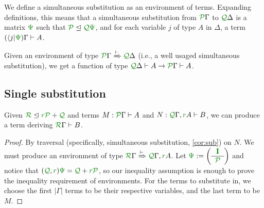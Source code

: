 \documentclass[submission,copyright,creativecommons]{eptcs}
\begin{document}
We define a simultaneous substitution as an environment of terms.
Expanding definitions, this means that a simultaneous substitution from
$\ctx\Gamma P$ to $\ctx\Delta Q$ is a matrix $\rescomment\Psi$ such that
$\resctx P \subres \resctx Q \rescomment\Psi$, and for each variable $j$ of
type $A$ in $\Delta$, a term $(\langle j \rvert\rescomment\Psi)\Gamma \vdash A$.

\begin{corollary}\label{cor:sub}
  Given an environment of type
  $\ctx{\Gamma}{P} \subst{\vdash} \ctx{\Delta}{Q}$ (i.e., a
  well usaged simultaneous substitution), we get a function of type
  $\ctx{\Delta}{Q} \vdash A \to \ctx{\Gamma}{P} \vdash A$.
\end{corollary}

\subsection{Single substitution}

\begin{corollary}\label{cor:single-subst}
  Given $\resctx R \subres \rescomment r \resctx P + \resctx Q$ and terms
  $M : \ctx\Gamma P \vdash A$ and $N : \ctx\Gamma Q, \ctxvar x A r \vdash B$,
  we can produce a term deriving $\ctx\Gamma R \vdash B$.
\end{corollary}
\begin{proof}
  By traversal (specifically, simultaneous substitution, \autoref{cor:sub})
  on $N$.
  We must produce an environment of type
  $\ctx\Gamma R \subst{\vdash} \ctx\Gamma Q, \ctxvar x A r$.
  Let \(
    \rescomment\Psi := \left(\begin{array}{c}
                               \rescomment{\mat I}
                               \\ \hline
                               \resctx P
                             \end{array}\right)
  \)
  and notice that $(\resctx Q, \rescomment r)\rescomment\Psi =
  \resctx Q + \rescomment r \resctx P$, so our inequality assumption is enough
  to prove the inequality requirement of environments.
  For the terms to substitute in, we choose the first $\lvert\Gamma\rvert$ terms
  to be their respective variables, and the last term to be $M$.
\end{proof}
\end{document}
